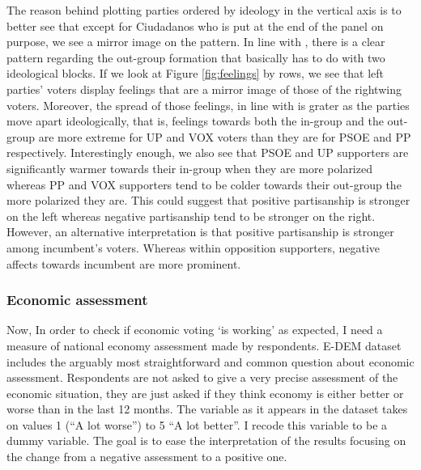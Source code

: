 \documentclass[a4paper, svgnames]{article}
\begin{document}
The reason behind plotting parties ordered by ideology in the vertical axis is to better see that except for Ciudadanos who is put at the end of the panel on purpose, we see a mirror image on the pattern. In line with \citep*{Orriols2020}, there is a clear pattern regarding the out-group formation that basically has to do with two ideological blocks. If we look at Figure \ref*{fig:feelings} by rows, we see that left parties' voters display feelings that are a mirror image of those of the rightwing voters. Moreover, the spread of those feelings, in line with \citep*{Wagner2021} is grater as the parties move apart ideologically, that is, feelings towards both the in-group and the  out-group are more extreme for UP and VOX voters than they are for PSOE and PP respectively. Interestingly enough, we also see that PSOE and UP supporters are significantly warmer towards their in-group when they are more polarized whereas PP and VOX supporters tend to be colder towards their out-group the more polarized they are. This could suggest that positive partisanship is stronger on the left whereas negative partisanship tend to be stronger on the right. However, an alternative interpretation is that positive partisanship is stronger among incumbent's voters. Whereas within opposition supporters, negative affects towards incumbent are more prominent.

\subsubsection{Economic assessment}

Now, In order to check if economic voting `is working' as expected, I need a measure of national economy assessment made by respondents. E-DEM dataset includes the arguably most straightforward and common question about economic assessment. Respondents are not asked to give a very precise assessment of the economic situation, they are just asked if they think economy is either better or worse than in the last 12 months.
The variable as it appears in the dataset takes on values 1 (``A lot worse'') to 5 ``A lot better''. I recode this variable to be a dummy variable. The goal is to ease the interpretation of the results focusing on the change from a negative assessment to a positive one.
\end{document}
